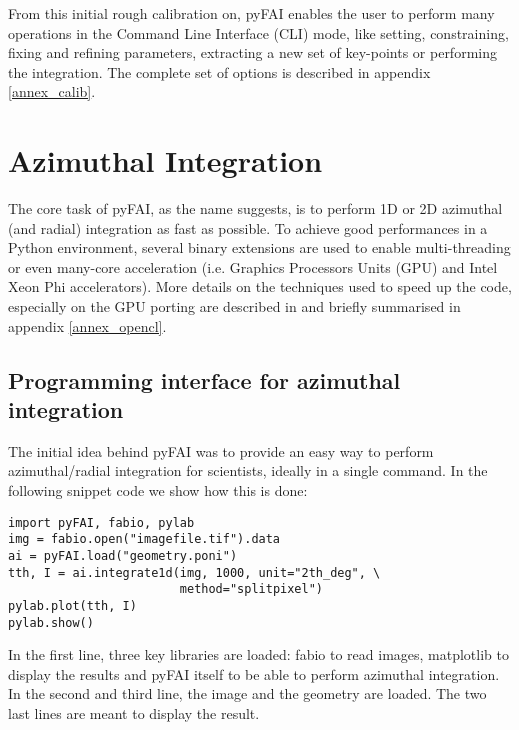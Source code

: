\documentclass{iucr}
\begin{document}
From this initial rough calibration on, pyFAI enables  the user to perform
many operations in the Command Line Interface (CLI) mode, like setting,
constraining, fixing and  refining parameters, extracting a new set of
key-points or performing the integration.
The complete set of options is described in appendix \ref{annex_calib}.

\section{Azimuthal Integration}

The core task of pyFAI, as the name suggests, is to perform 1D or 2D azimuthal
(and radial) integration as fast as possible. To achieve good performances in a
Python environment, several binary extensions are used to enable multi-threading
or even many-core acceleration (i.e. Graphics Processors Units (GPU) and Intel Xeon Phi
accelerators).
More details on the techniques used to speed up the code, especially on the GPU porting
are described in \cite{kieffer_ashiotis-proc-euroscipy-2014} and briefly
summarised in appendix \ref{annex_opencl}.

\subsection{Programming interface for azimuthal integration}

The initial idea behind pyFAI was to provide an easy way to perform
azimuthal/radial integration for scientists, ideally in a single command.
In the following snippet code we show how this is done:

\begin{verbatim}
import pyFAI, fabio, pylab
img = fabio.open("imagefile.tif").data
ai = pyFAI.load("geometry.poni")
tth, I = ai.integrate1d(img, 1000, unit="2th_deg", \
                        method="splitpixel")
pylab.plot(tth, I)
pylab.show()
\end{verbatim}

In the first line, three key libraries are loaded: fabio \cite{fabio} to read
images, matplotlib \cite{matplotlib} to display the results and pyFAI itself to
be able to perform azimuthal integration.
In the second and third line,  the image and the geometry are loaded.
The two last lines are meant to display the result.
\end{document}
